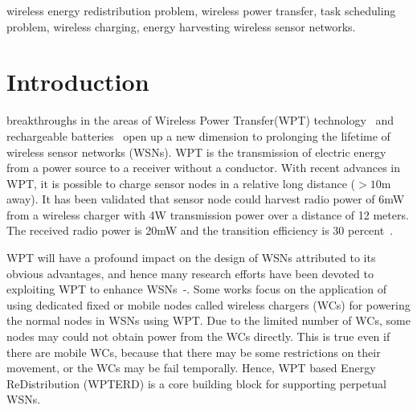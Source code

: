 \documentclass[journal,10pt]{IEEEtran}
\begin{document}
\begin{IEEEkeywords}
wireless energy redistribution problem, wireless power transfer, task scheduling problem, wireless charging, energy harvesting wireless sensor networks.
\end{IEEEkeywords}


\IEEEpeerreviewmaketitle



\section{Introduction}
\label{sec_intro}
\newtheorem{lemma}{\textbf{Lemma}}
\newtheorem{theorem}{\textbf{Theorem}}
\newtheorem{property}{\textbf{P}}
\newtheorem{corollary}{\textbf{Corollary}}
%
%
%
%

 breakthroughs in the areas of Wireless Power Transfer(WPT) technology~\cite{Kurs2007, Cannon2009} and rechargeable batteries~\cite{Kang2006} open up a new dimension to prolonging the lifetime of wireless sensor networks (WSNs). WPT is the transmission of electric energy from a power source to a receiver without a conductor. With recent advances in WPT, it is possible to charge sensor nodes in a relative long distance ($>10$m away)\cite{Guo2017}. It has been validated that sensor node could harvest radio power of 6mW from a wireless charger with 4W transmission power over a distance of 12 meters. The received radio power is 20mW and the transition efficiency is 30 percent~\cite{Nintana2012}.

WPT will have a profound impact on the design of WSNs attributed to its obvious advantages, and hence many research efforts have been devoted to exploiting WPT to enhance WSNs~\cite{Xiang2013}-\cite{Madhja2017}. Some works focus on the application of using dedicated fixed or mobile nodes called wireless chargers (WCs) for powering the normal nodes in WSNs using WPT. Due to the limited number of WCs, some nodes may could not obtain power from the WCs directly. This is true even if there are mobile WCs, because that there may be some restrictions on their movement, or the WCs may be fail temporally. Hence, WPT based Energy ReDistribution (WPTERD) is a core building block for supporting perpetual WSNs.
\end{document}
